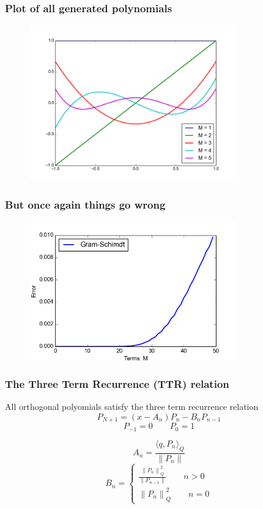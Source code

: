 \documentclass[handout]{beamer}
\newcommand{\norm}[1]{\left\lVert#1\right\rVert}
\begin{document}
\begin{frame}
 \frametitle{Plot of all generated polynomials}
  \begin{figure}
    \includegraphics[width=0.8\textwidth]{gramschmidtpoly.png}
  \end{figure}
\end{frame}


\begin{frame}
 \frametitle{But once again things go wrong}
    \begin{figure}
    \includegraphics[width=0.8\textwidth]{gramschmidterror1.png}
  \end{figure}
  
 \end{frame}


\begin{frame}
 \frametitle{The Three Term Recurrence (TTR) relation}
  All orthogonal polyomials satisfy the three term recurrence relation
  \[P_{N+1} = (x-A_n)P_n - B_nP_{n-1}\]
  \[P_{-1} = 0\qquad P_0 =1\]
    \pause
  
  \[A_n = \frac{\langle q,P_n\rangle_Q}{\norm{P_n}}\]
  \[B_n = 
  \begin{cases}
  \frac{\norm{P_n}^2_Q}{\norm{P_{n-1}}} \qquad n > 0\\
  \norm{P_n}^2_Q \qquad n = 0
  \end{cases}
  \]
  \end{frame}
\end{document}
